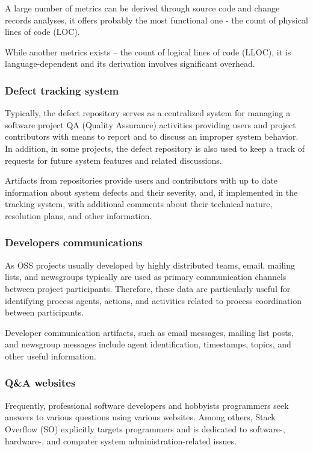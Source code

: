 A large number of metrics can be derived through source code and change records analyses, it offers probably the most functional one - the count of physical 
lines of code (LOC). 

While another metrics exists -- the count of logical lines of code (LLOC), it is language-dependent and its derivation involves 
significant overhead.


\subsubsection{Defect tracking system}
Typically, the defect repository serves as a centralized system for managing a software project QA (Quality Assurance) activities
providing users and project contributors with means to report and to discuss an improper system behavior.
In addition, in some projects, the defect repository is also used to keep a track of requests for future system features and related
discussions.

Artifacts from repositories provide users and contributors with up to date information about system defects and their severity, and, 
if implemented in the tracking system, with additional comments about their technical nature, resolution plans, and other information. 

\subsubsection{Developers communications}
As OSS projects usually developed by highly distributed teams, email, mailing lists, and newsgroups typically are 
used as primary communication channels between project participants. Therefore, these data are particularly useful for
identifying process agents, actions,  and activities related to process coordination between participants. 

Developer communication artifacts, such as email messages, mailing list posts, and newsgroup messages include agent identification, 
timestamps, topics, and other useful information. 

\subsubsection{Q\&A websites}
Frequently, professional software developers and hobbyists programmers seek answers to various questions using various websites. 
Among others, Stack Overﬂow (SO) explicitly targets programmers and is dedicated to software-, hardware-, and computer system 
administration-related issues.


